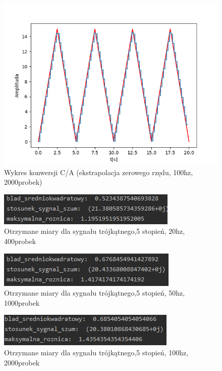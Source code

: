 \documentclass[12pt]{article}
\begin{document}
\begin{figure}[H]
\centering
\includegraphics[scale=0.6]{77trojkatekstr0rzedu100.png}
\caption{Wykres konwersji C/A (ekstrapolacja zerowego rzędu, 100hz, 2000probek)}
\end{figure}


\begin{figure}[H]
\centering
\includegraphics[scale=0.9]{555trojkatMiary20.png}
\caption{Otrzymane miary dla sygnału trójkątnego,5 stopień, 20hz, 400probek}
\end{figure}

\begin{figure}[H]
\centering
\includegraphics[scale=0.9]{555trojkatMiary50.png}
\caption{Otrzymane miary dla sygnału trójkątnego,5 stopień, 50hz, 1000probek}
\end{figure}

\begin{figure}[H]
\centering
\includegraphics[scale=0.9]{555trojkatMiary100.png}
\caption{Otrzymane miary dla sygnału trójkątnego,5 stopień, 100hz, 2000probek}
\end{figure}
\end{document}
